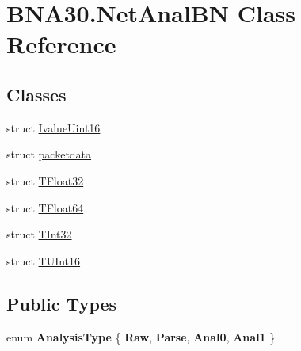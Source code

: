 \hypertarget{class_b_n_a30_1_1_net_anal_b_n}{}\section{B\+N\+A30.\+Net\+Anal\+BN Class Reference}
\label{class_b_n_a30_1_1_net_anal_b_n}
\subsection*{Classes}
\begin{DoxyCompactItemize}
\item 
struct \mbox{\hyperlink{struct_b_n_a30_1_1_net_anal_b_n_1_1_ivalue_uint16}{Ivalue\+Uint16}}
\item 
struct \mbox{\hyperlink{struct_b_n_a30_1_1_net_anal_b_n_1_1packetdata}{packetdata}}
\item 
struct \mbox{\hyperlink{struct_b_n_a30_1_1_net_anal_b_n_1_1_t_float32}{T\+Float32}}
\item 
struct \mbox{\hyperlink{struct_b_n_a30_1_1_net_anal_b_n_1_1_t_float64}{T\+Float64}}
\item 
struct \mbox{\hyperlink{struct_b_n_a30_1_1_net_anal_b_n_1_1_t_int32}{T\+Int32}}
\item 
struct \mbox{\hyperlink{struct_b_n_a30_1_1_net_anal_b_n_1_1_t_u_int16}{T\+U\+Int16}}
\end{DoxyCompactItemize}
\subsection*{Public Types}
\begin{DoxyCompactItemize}
\item 
\mbox{\label{class_b_n_a30_1_1_net_anal_b_n_a8ba7f7941119d9d3fc4cfe9a2f8bbd8d}} 
enum {\bfseries Analysis\+Type} \{ {\bfseries Raw}, 
{\bfseries Parse}, 
{\bfseries Anal0}, 
{\bfseries Anal1}
 \}
\end{DoxyCompactItemize}
